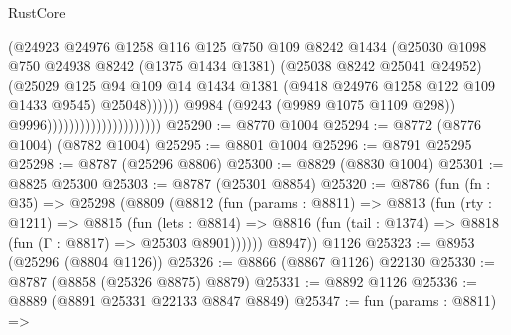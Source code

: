 \begin{lexlean}{RustCore}
\begin{coremodule}
                                                    (@24923
                                                      @24976
                                                      @1258
                                                      @116
                                                      @125
                                                      @750
                                                      @109
                                                      @8242
                                                      @1434
                                                      (@25030
                                                        @1098
                                                        @750
                                                        @24938
                                                        @8242
                                                        (@1375 @1434 @1381)
                                                        (@25038 @8242 @25041 @24952)
                                                        (@25029
                                                          @125
                                                          @94
                                                          @109
                                                          @14
                                                          @1434
                                                          @1381
                                                          (@9418 @24976 @1258 @122 @109 @1433 @9545)
                                                          @25048))))))
                                              @9984
                                              (@9243 (@9989 @1075 @1109 @298))
                                              @9996)))))))))))))))))))))
@25290 := @8770 @1004
@25294 := @8772 (@8776 @1004) (@8782 @1004)
@25295 := @8801 @1004
@25296 := @8791 @25295
@25298 := @8787 (@25296 @8806)
@25300 := @8829 (@8830 @1004)
@25301 := @8825 @25300
@25303 := @8787 (@25301 @8854)
@25320 := @8786
    (fun (fn : @35) =>
    @25298
      (@8809
        (@8812
          (fun (params : @8811) =>
          @8813
            (fun (rty : @1211) =>
            @8815
              (fun (lets : @8814) =>
              @8816 (fun (tail : @1374) => @8818 (fun (Γ : @8817) => @25303 @8901))))))
        @8947))
    @1126
@25323 := @8953 (@25296 (@8804 @1126))
@25326 := @8866 (@8867 @1126) @22130
@25330 := @8787 (@8858 (@25326 @8875) @8879)
@25331 := @8892 @1126
@25336 := @8889 (@8891 @25331 @22133 @8847 @8849)
@25347 := fun (params : @8811) =>

\end{coremodule}
\end{lexlean}
